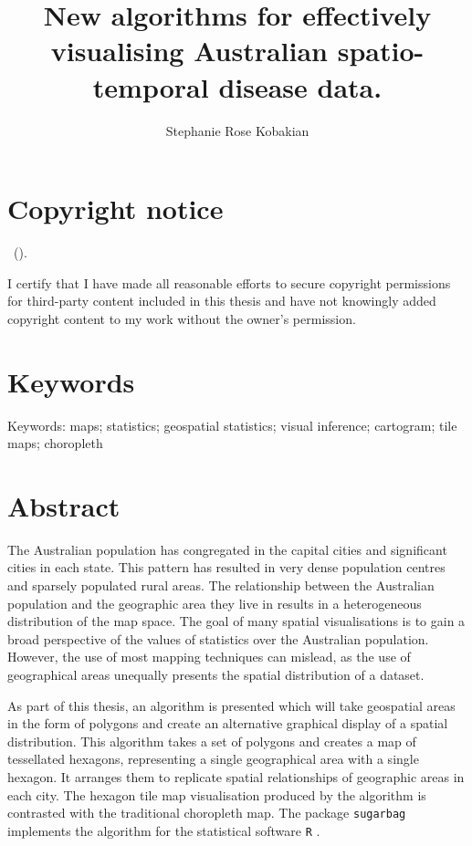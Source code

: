 \documentclass{monashthesis}
\author{Stephanie Rose Kobakian}
\title{New algorithms for effectively visualising Australian spatio-temporal disease data.}
\begin{document}

\titlepage

{\sf\tighttoc\doublespacing}

\hypertarget{copyright-notice}{%
\chapter*{Copyright notice}\label{copyright-notice}}

\textcopyright { } \authorname~(\number\the\year).

I certify that I have made all reasonable efforts to secure copyright permissions for third-party content included in this thesis and have not knowingly added copyright content to my work without the owner's permission.

\newpage

\hypertarget{keywords}{%
\chapter*{Keywords}\label{keywords}}

Keywords: maps; statistics; geospatial statistics; visual inference; cartogram; tile maps; choropleth

\hypertarget{abstract}{%
\chapter*{Abstract}\label{abstract}}

The Australian population has congregated in the capital cities and significant cities in each state. This pattern has resulted in very dense population centres and sparsely populated rural areas. The relationship between the Australian population and the geographic area they live in results in a heterogeneous distribution of the map space. The goal of many spatial visualisations is to gain a broad perspective of the values of statistics over the Australian population. However, the use of most mapping techniques can mislead, as the use of geographical areas unequally presents the spatial distribution of a dataset.

As part of this thesis, an algorithm is presented which will take geospatial areas in the form of polygons and create an alternative graphical display of a spatial distribution. This algorithm takes a set of polygons and creates a map of tessellated hexagons, representing a single geographical area with a single hexagon. It arranges them to replicate spatial relationships of geographic areas in each city. The hexagon tile map visualisation produced by the algorithm is contrasted with the traditional choropleth map.
The package \texttt{sugarbag} \autocite{sugarbag} implements the algorithm for the statistical software \texttt{R} \autocite{R}.
\end{document}
